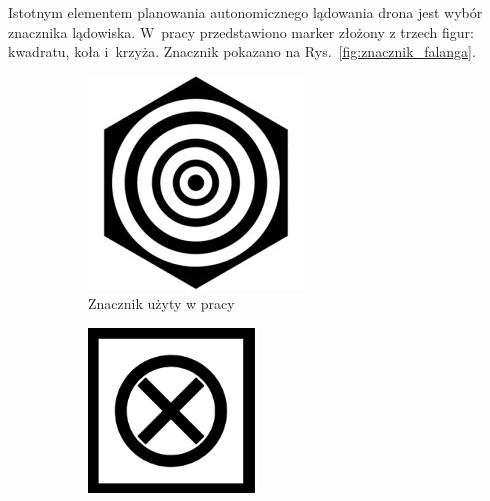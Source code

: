 Istotnym elementem planowania autonomicznego lądowania drona jest wybór znacznika lądowiska. 
W~pracy \cite{Falanga} przedstawiono marker złożony z trzech figur: kwadratu, koła i~krzyża. Znacznik pokazano na Rys.~\ref{fig:znacznik_falanga}. %
\begin{figure}
	\centering
	\begin{subfigure}{0.3\textwidth}
		\centering
		\includegraphics[width=\textwidth]{znacznik_rings.jpg}
		\caption{Znacznik użyty w pracy \cite{Rings}}
		\label{fig:znacznik_rings}
	\end{subfigure}
	\begin{subfigure}{0.3\textwidth}
		\centering
		\includegraphics[width=\textwidth]{znacznik_falanga.jpg}

\end{subfigure}
\end{figure}
